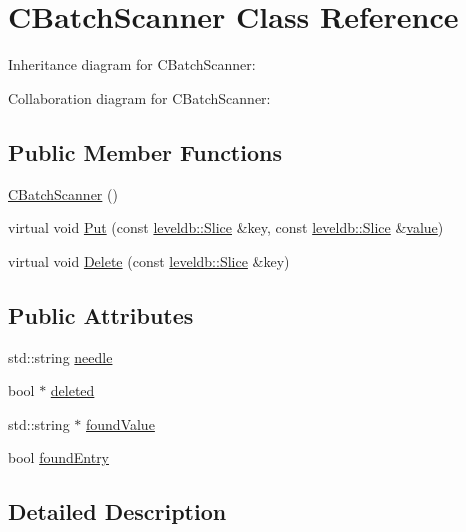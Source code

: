 \hypertarget{class_c_batch_scanner}{}\section{C\+Batch\+Scanner Class Reference}
\label{class_c_batch_scanner}


Inheritance diagram for C\+Batch\+Scanner\+:


Collaboration diagram for C\+Batch\+Scanner\+:
\subsection*{Public Member Functions}
\begin{DoxyCompactItemize}
\item 
\hyperlink{class_c_batch_scanner_adca0bf13e3c7eb3f70cf324da1901a4a}{C\+Batch\+Scanner} ()
\item 
virtual void \hyperlink{class_c_batch_scanner_ae993b8af4417559238d9d985975f9f09}{Put} (const \hyperlink{classleveldb_1_1_slice}{leveldb\+::\+Slice} \&key, const \hyperlink{classleveldb_1_1_slice}{leveldb\+::\+Slice} \&\hyperlink{cache_8cc_a0f61d63b009d0880a89c843bd50d8d76}{value})
\item 
virtual void \hyperlink{class_c_batch_scanner_a5569f5c1c04cbdaa1e226895d9cdb51a}{Delete} (const \hyperlink{classleveldb_1_1_slice}{leveldb\+::\+Slice} \&key)
\end{DoxyCompactItemize}
\subsection*{Public Attributes}
\begin{DoxyCompactItemize}
\item 
std\+::string \hyperlink{class_c_batch_scanner_ae04f7151c91676f9f6209737cdc3d086}{needle}
\item 
bool $\ast$ \hyperlink{class_c_batch_scanner_afdb6e59a53fed441090c43750c3c2617}{deleted}
\item 
std\+::string $\ast$ \hyperlink{class_c_batch_scanner_a3a82f2f7068f469eb535435a0b9ae640}{found\+Value}
\item 
bool \hyperlink{class_c_batch_scanner_ad2669c1d3fbd8c206b1f42348dde8cf0}{found\+Entry}
\end{DoxyCompactItemize}


\subsection{Detailed Description}


